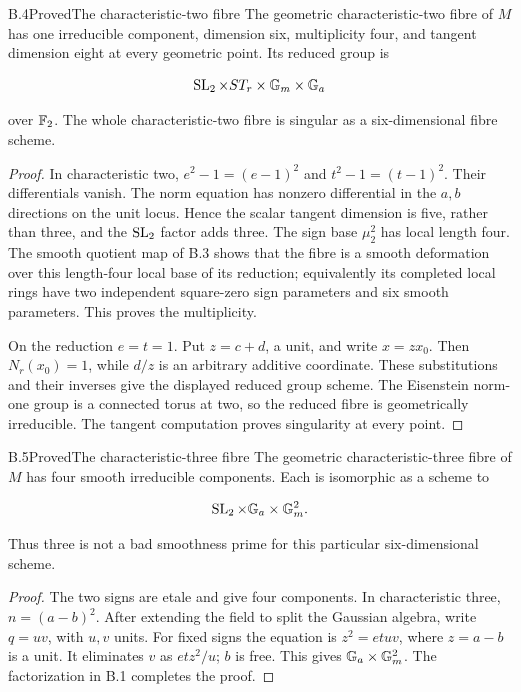 \begin{statement}{B.4}{Proved}{The characteristic-two fibre}
The geometric characteristic-two fibre of $M$ has one
irreducible component, dimension six, multiplicity four,
and tangent dimension eight at every geometric point.
Its reduced group is

$$
\operatorname{SL}_2\times ST_r\times\mathbb G_m\times\mathbb G_a
$$

over $\mathbb F_2$. The whole characteristic-two fibre is singular
as a six-dimensional fibre scheme.
\end{statement}
\begin{proof}
In characteristic two,
$e^2-1=(e-1)^2$ and $t^2-1=(t-1)^2$.
Their differentials vanish. The norm equation has nonzero
differential in the $a,b$ directions on the unit locus.
Hence the scalar tangent dimension is five, rather than
three, and the $\operatorname{SL}_2$ factor adds three.
The sign base $\mu_2^2$ has local length four.
The smooth quotient map of B.3 shows that the fibre is a
smooth deformation over this length-four local base of its
reduction; equivalently its completed local rings have two
independent square-zero sign parameters and six smooth
parameters. This proves the multiplicity.

On the reduction $e=t=1$. Put $z=c+d$, a unit, and write
$x=z x_0$. Then $N_r(x_0)=1$, while $d/z$ is an arbitrary
additive coordinate. These substitutions and their inverses
give the displayed reduced group scheme.
The Eisenstein norm-one group is a connected torus at two,
so the reduced fibre is geometrically irreducible.
The tangent computation proves singularity at every point.
\end{proof}

\begin{statement}{B.5}{Proved}{The characteristic-three fibre}
The geometric characteristic-three fibre of $M$ has four
smooth irreducible components. Each is isomorphic as a
scheme to

$$
\operatorname{SL}_2\times\mathbb G_a\times\mathbb G_m^2.
$$

Thus three is not a bad smoothness prime for this particular
six-dimensional scheme.
\end{statement}
\begin{proof}
The two signs are etale and give four components.
In characteristic three, $n=(a-b)^2$.
After extending the field to split the Gaussian algebra,
write $q=uv$, with $u,v$ units.
For fixed signs the equation is $z^2=etuv$, where
$z=a-b$ is a unit. It eliminates $v$ as $et z^2/u$;
$b$ is free. This gives $\mathbb G_a\times\mathbb G_m^2$.
The factorization in B.1 completes the proof.
\end{proof}

